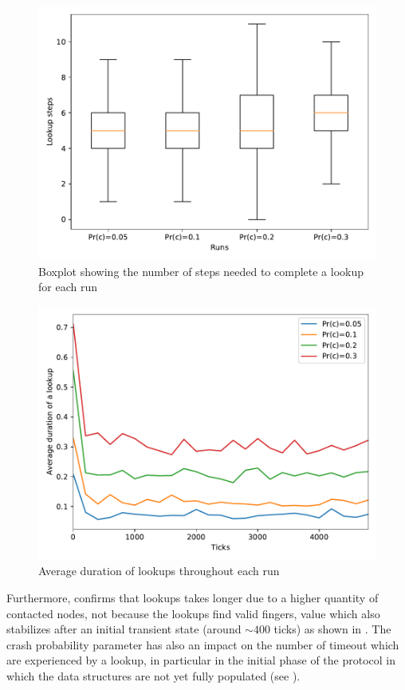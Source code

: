 \documentclass[11pt,twocolumn,letterpaper]{article}
\begin{document}
		\begin{figure}[!h]
			\centering
			\includegraphics[width=\linewidth,clip,trim=0 0.5cm 0 0.35cm]{figures/analysis1/lookuplength_box.pdf}
			\caption{Boxplot showing the number of steps needed to complete a lookup for each run}
			\label{fig:crash1}
		\end{figure}
		\begin{figure}[!h]
			\centering
			\includegraphics[width=\linewidth,clip,trim=0 0.5cm 0 0.35cm]{figures/analysis1/lookupduration_time.pdf}
			\caption{Average duration of lookups throughout each run}
			\label{fig:crash2}
		\end{figure}

		Furthermore,  confirms that lookups takes longer due to a higher quantity of contacted nodes, not because the lookups find valid fingers, value which also stabilizes after an initial transient state (around $\sim400$ ticks) as shown in . The crash probability parameter has also an impact on the number of timeout which are experienced by a lookup, in particular in the initial phase of the protocol in which the data structures are not yet fully populated (see ). 
\end{document}
